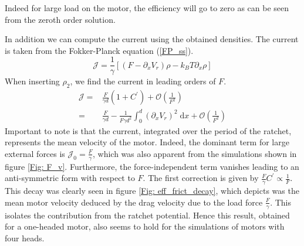 \documentclass[aps,pre,twocolumn,showpacs,showkeys]{revtex4-1}
\newcommand{\rmd}{{\mathrm d}}
\begin{document}
Indeed for large load on the motor, the efficiency will go to zero as can be seen from the zeroth order solution.
\par
In addition we can compute the current using the obtained densities. 
The current is taken from the Fokker-Planck equation (\ref{FP_ss}).
\begin{equation}
\mathcal{J} = \frac{1}{\gamma} \left[ \left( F - \partial_x V_r \right) \rho - k_B T \partial_x \rho \right] 
\end{equation}
When inserting $\rho_2$, we find the current in leading orders of $F$.
\begin{align*}
\mathcal{J} =& \frac{F}{\gamma d} \left( 1 + C^\prime \right) + \mathcal{O}( \frac{1}{F^2} ) \\
=& \frac{F}{\gamma d} - \frac{1}{F\gamma d^2} \int^d_0 \left( \partial_x V_r \right)^2 \; \rmd x + \mathcal{O}(\frac{1}{F^2}) 
\end{align*}
Important to note is that the current, integrated over the period of the ratchet, represents the mean velocity of the motor. 
Indeed, the dominant term for large external forces is $\mathcal{J}_0 = \frac{F}{\gamma}$, which was also apparent from the simulations shown in figure \ref{Fig: F_v}. 
Furthermore, the force-independent term vanishes leading to an anti-symmetric form with respect to $F$. 
The first correction is given by $\frac{F}{\gamma}C^\prime\propto \frac{1}{F}$. 
This decay was clearly seen in figure \ref{Fig: eff_frict_decay}, which depicts was the mean motor velocity deduced by the drag velocity due to the load force $\frac{F}{\gamma}$. 
This isolates the contribution from the ratchet potential. 
Hence this result, obtained for a one-headed motor, also seems to hold for the simulations of motors with four heads. 
\end{document}
